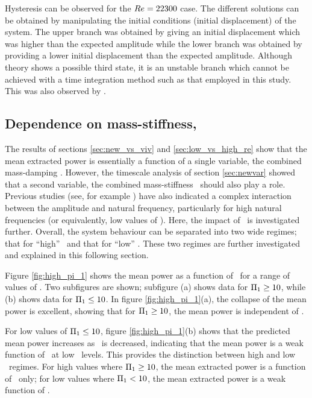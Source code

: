 

Hysteresis can be observed for the $Re = 22300$ case. The different solutions can be obtained by manipulating the initial conditions (initial displacement) of the system. The upper branch was obtained by giving an initial displacement which was higher than the expected amplitude while the lower branch was obtained by providing a lower initial displacement than the expected amplitude. Although theory shows a possible third state, it is an unstable branch which cannot be achieved with a time integration method such as that employed in this study. This was also observed by \cite{Vio2007}.


\subsection{Dependence on mass-stiffness, \massstiff}
\label{subsec:dependence pi_1}

The results of sections \ref{sec:new_vs_viv} and \ref{sec:low_vs_high_re} show that the mean extracted power is essentially a function of a single variable, the combined mass-damping \massdamp. However, the timescale analysis of section \ref{sec:newvar} showed that a second variable, the combined mass-stiffness \massstiff\ should also play a role. Previous studies (see, for example \citet{bouclin:77}) have also indicated a complex interaction between the amplitude and natural frequency, particularly for high natural frequencies (or equivalently, low values of \massstiff). Here, the impact of \massstiff\ is investigated further. Overall, the system behaviour can be separated into two wide regimes; that for ``high'' \massstiff\ and that for ``low'' \massstiff. These two regimes are further investigated and explained in this following section.

Figure \ref{fig:high_pi_1} shows the mean power as a function of \massdamp\ for a range of values of \massstiff. Two subfigures are shown; subfigure (a) shows data for $\Pi_1 \geq 10$, while (b) shows data for $\Pi_1 \leq 10$. In figure \ref{fig:high_pi_1}(a), the collapse of the mean power is excellent, showing that for $\Pi_1 \geq 10$, the mean power is independent of \massstiff.



For low values of $\Pi_1 \leq 10$, figure \ref{fig:high_pi_1}(b) shows that the predicted mean power increases as \massstiff\ is decreased, indicating that the mean power is a weak function of \massstiff\ at low \massstiff\ levels. This provides the distinction between high and low \massstiff\ regimes. For high values where $\Pi_1 \geq 10$, the mean extracted power is a function of \massdamp\ only; for low values where $\Pi_1 < 10$, the mean extracted power is a weak function of \massstiff.

